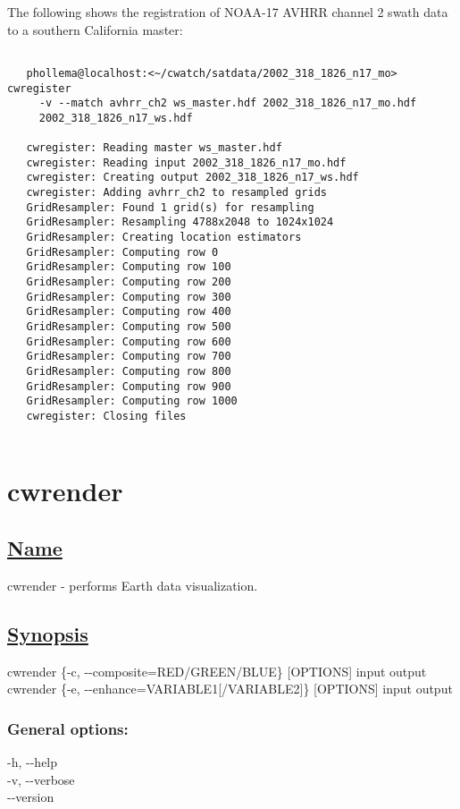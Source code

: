   The following shows the registration of NOAA-17 AVHRR channel 2 swath data to a southern California master: \begin{verbatim}

   phollema@localhost:<~/cwatch/satdata/2002_318_1826_n17_mo> cwregister 
     -v --match avhrr_ch2 ws_master.hdf 2002_318_1826_n17_mo.hdf 
     2002_318_1826_n17_ws.hdf

   cwregister: Reading master ws_master.hdf
   cwregister: Reading input 2002_318_1826_n17_mo.hdf
   cwregister: Creating output 2002_318_1826_n17_ws.hdf
   cwregister: Adding avhrr_ch2 to resampled grids
   GridResampler: Found 1 grid(s) for resampling
   GridResampler: Resampling 4788x2048 to 1024x1024
   GridResampler: Creating location estimators
   GridResampler: Computing row 0
   GridResampler: Computing row 100
   GridResampler: Computing row 200
   GridResampler: Computing row 300
   GridResampler: Computing row 400
   GridResampler: Computing row 500
   GridResampler: Computing row 600
   GridResampler: Computing row 700
   GridResampler: Computing row 800
   GridResampler: Computing row 900
   GridResampler: Computing row 1000
   cwregister: Closing files
 
\end{verbatim}


\newpage
\section{cwrender} \hypertarget{cwrender}{}
\subsection*{\underline{Name}}


   cwrender - performs Earth data visualization.  
\subsection*{\underline{Synopsis}}


  cwrender \{-c, -{-}composite=RED/GREEN/BLUE\} [OPTIONS] input output \\ 
 cwrender \{-e, -{-}enhance=VARIABLE1[/VARIABLE2]\} [OPTIONS] input output 
\subsubsection*{General options:}


  -h, -{-}help \\ 
 -v, -{-}verbose \\ 
 -{-}version \\ 

